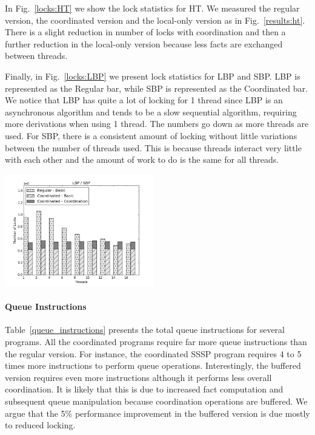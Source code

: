 In Fig.~\ref{locks:HT} we show the lock statistics for HT. We measured the
regular version, the coordinated version and the local-only version as in
Fig.~\ref{results:ht}. There is a slight reduction in number of locks with
coordination and then a further reduction in the local-only version because less
facts are exchanged between threads.

Finally, in Fig.~\ref{locks:LBP} we present lock statistics for LBP and SBP. LBP
is represented as the Regular bar, while SBP is represented as the Coordinated
bar. We notice that LBP has quite a lot of locking for 1 thread since LBP
is an asynchronous algorithm and tends to be a slow sequential algorithm,
requiring more derivations when using 1 thread. The numbers go down as more
threads are used. For SBP, there is a consistent amount of locking without
little variations between the number of threads used. This is because threads
interact very little with each other and the amount of work to do is the same
for all threads.

\begin{topfig}
   \begin{center}
      \includegraphics[width=6.5cm]{results/locks/bp.png}
   \end{center}
\end{topfig}

\paragraph{Queue Instructions}

Table~\ref{queue_instructions} presents the total queue instructions for several
programs. All the coordinated programs require far more queue instructions than
the regular version. For instance, the coordinated SSSP program requires 4 to 5
times more instructions to perform queue operations. Interestingly, the buffered
version requires even more instructions although it performs less overall
coordination. It is likely that this is due to increased fact computation and
subsequent queue manipulation because coordination operations are buffered.
We argue that the 5\% performance improvement in the
buffered version is due mostly to reduced locking.

